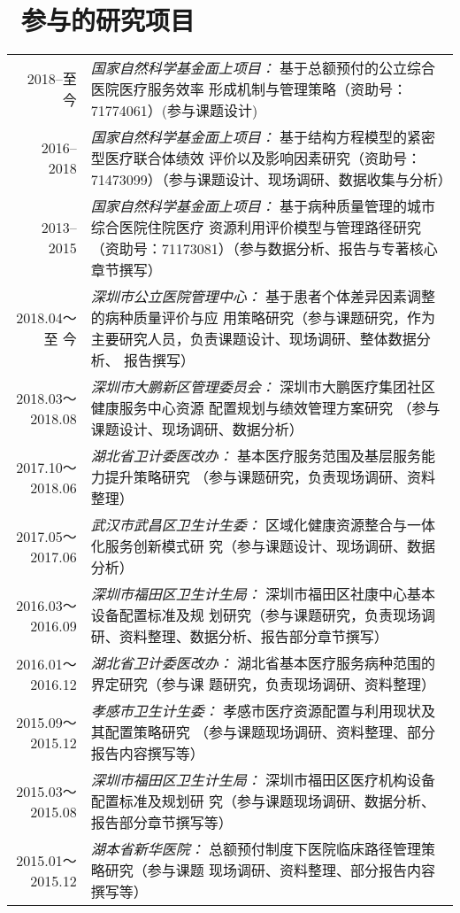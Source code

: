 \documentclass{resume}
\begin{document}
\section{\faPuzzlePiece\ 参与的研究项目}
\begin{longtable}{r p{13.3cm}}
2018--至今 & \textit{国家自然科学基金面上项目：} 基于总额预付的公立综合医院医疗服务效率 形成机制与管理策略（资助号：71774061）(参与课题设计)\\
2016--2018 & \textit{国家自然科学基金面上项目：} 基于结构方程模型的紧密型医疗联合体绩效 评价以及影响因素研究（资助号：71473099）（参与课题设计、现场调研、数据收集与分析）\\
2013--2015 & \textit{国家自然科学基金面上项目：} 基于病种质量管理的城市综合医院住院医疗 资源利用评价模型与管理路径研究（资助号：71173081）（参与数据分析、报告与专著核心章节撰写）\\
2018.04～至 今 & \textit{深圳市公立医院管理中心：} 基于患者个体差异因素调整的病种质量评价与应 用策略研究（参与课题研究，作为主要研究人员，负责课题设计、现场调研、整体数据分析、 报告撰写）\\
2018.03～2018.08 & \textit{深圳市大鹏新区管理委员会：} 深圳市大鹏医疗集团社区健康服务中心资源 配置规划与绩效管理方案研究 （参与课题设计、现场调研、数据分析）\\
2017.10～2018.06 & \textit{湖北省卫计委医改办：} 基本医疗服务范围及基层服务能力提升策略研究 （参与课题研究，负责现场调研、资料整理）\\
2017.05～2017.06 & \textit{武汉市武昌区卫生计生委：} 区域化健康资源整合与一体化服务创新模式研 究（参与课题设计、现场调研、数据分析）\\
2016.03～2016.09 & \textit{深圳市福田区卫生计生局：} 深圳市福田区社康中心基本设备配置标准及规 划研究（参与课题研究，负责现场调研、资料整理、数据分析、报告部分章节撰写）\\
2016.01～2016.12 & \textit{湖北省卫计委医改办：} 湖北省基本医疗服务病种范围的界定研究（参与课 题研究，负责现场调研、资料整理）\\
2015.09～2015.12 & \textit{孝感市卫生计生委：} 孝感市医疗资源配置与利用现状及其配置策略研究 （参与课题现场调研、资料整理、部分报告内容撰写等）\\
2015.03～2015.08 & \textit{深圳市福田区卫生计生局：} 深圳市福田区医疗机构设备配置标准及规划研 究（参与课题现场调研、数据分析、报告部分章节撰写等）\\
2015.01～2015.12 & \textit{湖本省新华医院：} 总额预付制度下医院临床路径管理策略研究（参与课题 现场调研、资料整理、部分报告内容撰写等）\\
\end{longtable}
\end{document}
